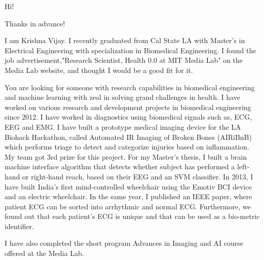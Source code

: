 \documentclass[11pt,a4paper,roman]{moderncv}
\begin{document}
\date{\today}
\opening{Hi!}
\closing{Thanks in advance!}
\makelettertitle


I am Krishna Vijay. I recently graduated from Cal State LA with Master's in Electrical Engineering with specialization in Biomedical Engineering. I found the job advertisement,"Research Scientist, Health 0.0 at MIT Media Lab" on the Media Lab website, and thought I would be a good fit for it.


You are looking for someone with research capabilities in biomedical engineering and machine learning with zeal in solving grand challenges in health. I have worked on various research and development projects in biomedical engineering since 2012. I have worked in diagnostics using biomedical signals such as, ECG, EEG and EMG. I have built a prototype medical imaging device for the LA Biohack Hackathon, called Automated IR Imaging of Broken Bones (AIRiBnB) which performs triage to detect and categorize injuries based on inflammation. My team got 3rd prize for this project. 
For my Master's thesis, I built a brain machine interface algorithm that detects whether subject has performed a left-hand or right-hand reach, based on their EEG and an SVM classifier.
In 2013, I have built India's first mind-controlled wheelchair using the Emotiv BCI device and an electric wheelchair. In the same year, I published an IEEE paper, where patient ECG can be sorted into arrhythmic and normal ECG. Furthermore, we found out that each patient's ECG is unique and that can be used as a bio-metric identifier. 

I have also completed the short program Advances in Imaging and AI course offered at the Media Lab.
\end{document}
